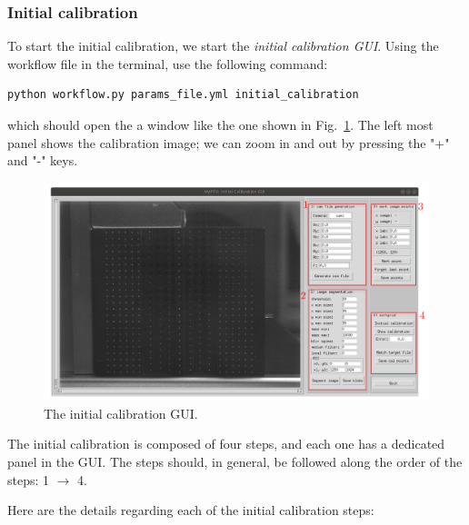 \documentclass[10pt,a4paper]{article}
\begin{document}
\subsubsection{Initial calibration}\label{sec:init_calibration}


To start the initial calibration, we start the \textit{initial calibration GUI}. Using the workflow file in the terminal, use the following command:
%
\begin{verbatim}
python workflow.py params_file.yml initial_calibration
\end{verbatim} 
%
which should open the a window like the one shown in Fig.~\ref{fig:init_cal_gui}. The left most panel shows the calibration image; we can zoom in and out by pressing the "+" and "-" keys. 

\begin{figure}
	\includegraphics[width=1.0\textwidth]{initial_calibration.pdf}
	\caption{The initial calibration GUI. \label{fig:init_cal_gui}}
\end{figure}


The initial calibration is composed of four steps, and each one has a dedicated panel in the GUI. The steps should, in general, be followed along the order of the steps: 1 $\rightarrow$ 4.   


Here are the details regarding each of the initial calibration steps:
\end{document}

